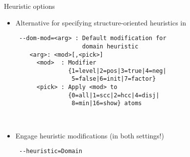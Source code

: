\begin{frame}[fragile]{Heuristic options}
  \begin{itemize}
  \item<1-> Alternative for specifying structure-oriented heuristics
  \pause in \clasp
  \\\medskip
\begin{minipage}[t]{0.8\linewidth}\small
\begin{verbatim}
 --dom-mod=<arg> : Default modification for
                   domain heuristic
    <arg>: <mod>[,<pick>]
      <mod>  : Modifier
               {1=level|2=pos|3=true|4=neg|
                5=false|6=init|7=factor}
      <pick> : Apply <mod> to
               {0=all|1=scc|2=hcc|4=disj|
                8=min|16=show} atoms
\end{verbatim}
\end{minipage}
\\\bigskip
\item<3-> Engage heuristic modifications (in both settings!)
\begin{verbatim}
 --heuristic=Domain
\end{verbatim}
  \end{itemize}
\end{frame}
%
